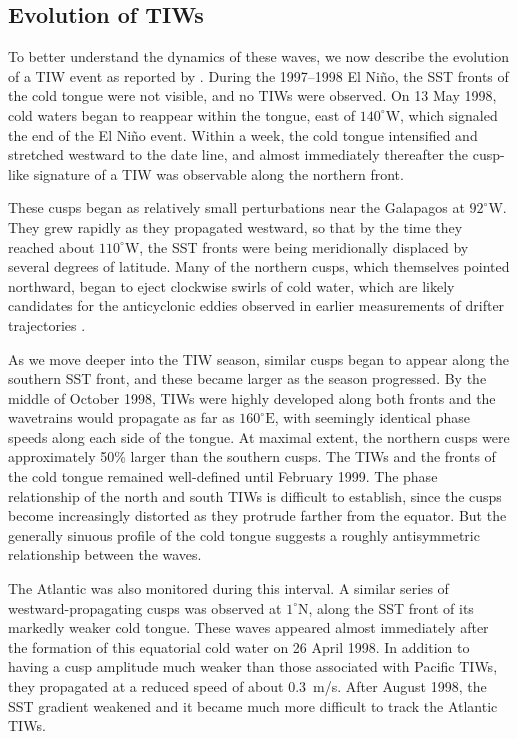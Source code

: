 \documentclass[letterpaper, 11pt, onecolumn]{article}
\newcommand{\degree}{^{\circ}} \newcommand{\abs}[1]{\lvert#1\rvert}
\begin{document}
\subsection{Evolution of TIWs}

To better understand the dynamics of these waves, we now describe the evolution
of a TIW event as reported by \citet{Chelton++:2000}. During the 1997--1998 El
Ni\~no, the SST fronts of the cold tongue were not visible, and no TIWs were
observed. On 13 May 1998, cold waters began to reappear within the tongue, east
of $140\degree\text{W}$, which signaled the end of the El Ni\~no event. Within
a week, the cold tongue intensified and stretched westward to the date line,
and almost immediately thereafter the cusp-like signature of a TIW was
observable along the northern front.

These cusps began as relatively small perturbations near the Galapagos at
$92\degree\text{W}$. They grew rapidly as they propagated westward, so that by
the time they reached about $110\degree\text{W}$, the SST fronts were being
meridionally displaced by several degrees of latitude. Many of the northern
cusps, which themselves pointed northward, began to eject clockwise swirls of
cold water, which are likely candidates for the anticyclonic eddies observed in
earlier measurements of drifter trajectories \citep{Hansen-Paul:1984}.

As we move deeper into the TIW season, similar cusps began to appear along the
southern SST front, and these became larger as the season progressed. By the
middle of October 1998, TIWs were highly developed along both fronts and the
wavetrains would propagate as far as $160\degree\text{E}$, with seemingly
identical phase speeds along each side of the tongue. At maximal extent, the
northern cusps were approximately 50\% larger than the southern cusps. The TIWs
and the fronts of the cold tongue remained well-defined until February 1999.
The phase relationship of the north and south TIWs is difficult to establish,
since the cusps become increasingly distorted as they protrude farther from the
equator. But the generally sinuous profile of the cold tongue suggests a
roughly antisymmetric relationship between the waves.


The Atlantic was also monitored during this interval. A similar series of
westward-propagating cusps was observed at $1\degree\text{N}$, along the SST
front of its markedly weaker cold tongue. These waves appeared almost
immediately after the formation of this equatorial cold water on 26 April 1998.
In addition to having a cusp amplitude much weaker than those associated with
Pacific TIWs, they propagated at a reduced speed of about 0.3~m/s. After August
1998, the SST gradient weakened and it became much more difficult to track the
Atlantic TIWs.
\end{document}
